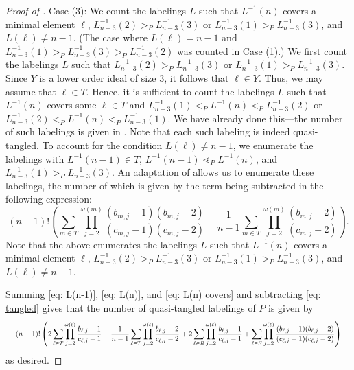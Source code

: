 \documentclass[11pt]{amsart}
\theoremstyle{definition}
\newcommand{\inverse}{^{-1}}
\begin{document}
\begin{proof}[Proof of ]
	Case (3): We count the labelings $ L $ such that $ L\inverse(n) $ covers a minimal element $ \ell $, $ L_{n-3}\inverse(2)>_PL_{n-3}\inverse(3) $ or $ L_{n-3}\inverse(1)>_PL_{n-3}\inverse(3) $, and $ L(\ell)\neq n-1 $. (The case where $ L(\ell)=n-1 $ and $ L_{n-3}\inverse(1)>_PL_{n-3}\inverse(3)>_PL_{n-3}\inverse(2) $ was counted in Case (1).) We first count the labelings $ L $ such that  $ L_{n-3}\inverse(2)>_PL_{n-3}\inverse(3) $ or $ L_{n-3}\inverse(1)>_PL_{n-3}\inverse(3) $. Since $ Y $ is a lower order ideal of size 3, it follows that $ \ell\in Y $. Thus, we may assume that $ \ell\in T $. Hence, it is sufficient to count the labelings $ L $ such that $ L\inverse(n) $ covers some $ \ell\in T $ and $ L_{n-3}\inverse(1)<_PL\inverse(n)<_PL_{n-3}\inverse(2) $ or $ L_{n-3}\inverse(2)<_PL\inverse(n)<_PL_{n-3}\inverse(1) $. We have already done this---the number of such labelings is given in . Note that each such labeling is indeed quasi-tangled. To account for the condition $ L(\ell)\neq n-1 $, we enumerate the labelings with $ L\inverse(n-1)\in T $, $ L\inverse(n-1)\lessdot_PL\inverse(n) $, and $ L_{n-3}\inverse(1)>_P L_{n-3}\inverse(3) $. An adaptation of  allows us to enumerate these labelings, the number of which is given by the term being subtracted in the following expression: \begin{equation}\label{eq: L(n) covers}
		(n-1)!\left(\sum_{m\in T}\prod_{j=2}^{\omega(m)}\frac{(b_{m,j}-1)(b_{m,j}-2)}{(c_{m,j}-1)(c_{m,j}-2)}-\frac{1}{n-1}\sum_{m\in T}\prod_{j=2}^{\omega(m)}\frac{(b_{m,j}-2)}{(c_{m,j}-2)}\right).
	\end{equation} Note that the above enumerates the labelings $ L $ such that $ L\inverse(n) $ covers a minimal element $ \ell $, $ L_{n-3}\inverse(2)>_PL_{n-3}\inverse(3) $ or $ L_{n-3}\inverse(1)>_PL_{n-3}\inverse(3) $, and $ L(\ell)\neq n-1 $.
	
	Summing \eqref{eq: L(n-1)}, \eqref{eq: L(n)}, and \eqref{eq: L(n) covers} and subtracting \eqref{eq: tangled} gives that the number of quasi-tangled labelings of $ P $ is given by \begin{equation*}\resizebox{\textwidth}{!} 
		{
			$(n-1)!\left(2\displaystyle\sum_{\ell\in T}\prod_{j=2}^{\omega(\ell)}\frac{b_{\ell,j}-1}{c_{\ell,j}-1}-\frac{1}{n-1}\sum_{\ell\in T}\prod_{j=2}^{\omega(\ell)}\frac{b_{\ell,j}-2}{c_{\ell,j}-2}+2\sum_{\ell\in R}\prod_{j=2}^{\omega(\ell)}\frac{b_{\ell,j}-1}{c_{\ell,j}-1}+\sum_{\ell\in S}\prod_{j=2}^{\omega(\ell)}\frac{(b_{\ell,j}-1)(b_{\ell,j}-2)}{(c_{\ell,j}-1)(c_{\ell,j}-2)}\right)$
		}
	\end{equation*} as desired. 
\end{proof}
\end{document}
